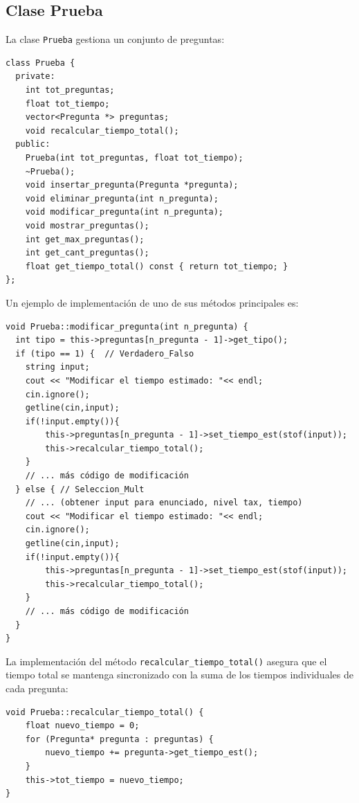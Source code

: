 \documentclass[12pt]{article}
\begin{document}
\subsection{Clase Prueba}
La clase \texttt{Prueba} gestiona un conjunto de preguntas:

\begin{lstlisting}[style=customc]
class Prueba {
  private:
    int tot_preguntas;
    float tot_tiempo;
    vector<Pregunta *> preguntas;
    void recalcular_tiempo_total();
  public:
    Prueba(int tot_preguntas, float tot_tiempo);
    ~Prueba();
    void insertar_pregunta(Pregunta *pregunta);
    void eliminar_pregunta(int n_pregunta);
    void modificar_pregunta(int n_pregunta);
    void mostrar_preguntas();
    int get_max_preguntas();
    int get_cant_preguntas();
    float get_tiempo_total() const { return tot_tiempo; }
};
\end{lstlisting}

Un ejemplo de implementaci\'on de uno de sus m\'etodos principales es:

\begin{lstlisting}[style=customc]
void Prueba::modificar_pregunta(int n_pregunta) {
  int tipo = this->preguntas[n_pregunta - 1]->get_tipo();
  if (tipo == 1) {  // Verdadero_Falso
    string input;
    cout << "Modificar el tiempo estimado: "<< endl;
    cin.ignore();
    getline(cin,input);
    if(!input.empty()){
        this->preguntas[n_pregunta - 1]->set_tiempo_est(stof(input));
        this->recalcular_tiempo_total();
    }
    // ... más código de modificación
  } else { // Seleccion_Mult
    // ... (obtener input para enunciado, nivel tax, tiempo)
    cout << "Modificar el tiempo estimado: "<< endl;
    cin.ignore();
    getline(cin,input);
    if(!input.empty()){
        this->preguntas[n_pregunta - 1]->set_tiempo_est(stof(input));
        this->recalcular_tiempo_total();
    }
    // ... más código de modificación
  }
}
\end{lstlisting}

La implementación del método \texttt{recalcular\_tiempo\_total()} asegura que el tiempo total se mantenga sincronizado con la suma de los tiempos individuales de cada pregunta:

\begin{lstlisting}[style=customc]
void Prueba::recalcular_tiempo_total() {
    float nuevo_tiempo = 0;
    for (Pregunta* pregunta : preguntas) {
        nuevo_tiempo += pregunta->get_tiempo_est();
    }
    this->tot_tiempo = nuevo_tiempo;
}
\end{lstlisting}
\end{document}
